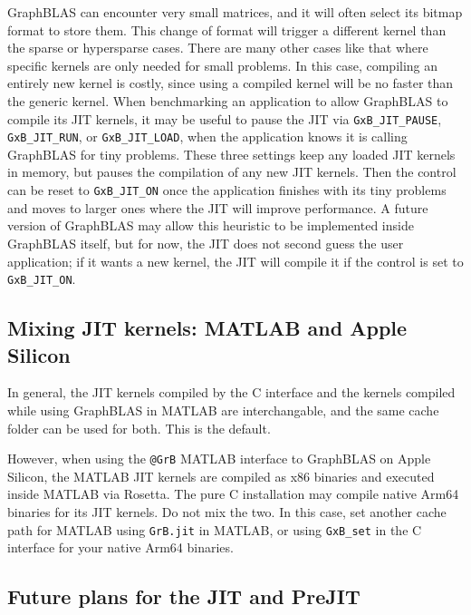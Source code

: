 \documentclass[12pt]{article}
\begin{document}
GraphBLAS can encounter very small matrices, and it will often select its
bitmap format to store them.  This change of format will trigger a different
kernel than the sparse or hypersparse cases.  There are many other cases like
that where specific kernels are only needed for small problems.  In this case,
compiling an entirely new kernel is costly, since using a compiled kernel will
be no faster than the generic kernel.  When benchmarking an application to
allow GraphBLAS to compile its JIT kernels, it may be useful to pause the JIT
via \verb'GxB_JIT_PAUSE', \verb'GxB_JIT_RUN', or \verb'GxB_JIT_LOAD', when the
application knows it is calling GraphBLAS for tiny problems.  These three
settings keep any loaded JIT kernels in memory, but pauses the compilation of
any new JIT kernels.  Then the control can be reset to \verb'GxB_JIT_ON' once
the application finishes with its tiny problems and moves to larger ones where
the JIT will improve performance.  A future version of GraphBLAS may allow
this heuristic to be implemented inside GraphBLAS itself, but for now, the
JIT does not second guess the user application; if it wants a new kernel,
the JIT will compile it if the control is set to \verb'GxB_JIT_ON'.

\subsection{Mixing JIT kernels: MATLAB and Apple Silicon}

In general, the JIT kernels compiled by the C interface and the kernels
compiled while using GraphBLAS in MATLAB are interchangable, and the same cache
folder can be used for both.  This is the default.

However, when using the \verb'@GrB' MATLAB interface to GraphBLAS on Apple
Silicon, the MATLAB JIT kernels are compiled as x86 binaries and executed
inside MATLAB via Rosetta.  The pure C installation may compile native Arm64
binaries for its JIT kernels.  Do not mix the two.  In this case, set another
cache path for MATLAB using \verb'GrB.jit' in MATLAB, or using \verb'GxB_set'
in the C interface for your native Arm64 binaries.

\subsection{Future plans for the {\sf JIT} and {\sf PreJIT}}
\label{jit_future}
\end{document}
